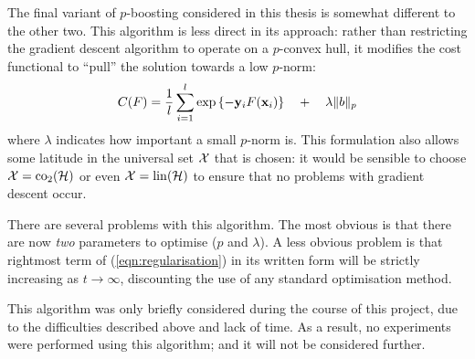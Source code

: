 The final variant of $p$-boosting considered in this thesis is
somewhat different to the other two.  This algorithm is less direct in
its approach: rather than restricting the gradient descent algorithm
to operate on a $p$-convex hull, it modifies the cost functional to
``pull'' the solution towards a low $p$-norm:
%
\begin{equation}
C(F) = \frac{1}{l} \sum_{i=1}^{l} \exp
\left\{ -\mathbf{y}_iF(\mathbf{x}_i) \right\} \quad + \quad \lambda \|b\|_p
\label{eqn:regularisation}
\end{equation}
%
where $\lambda$ indicates how important a small $p$-norm is.  This
formulation also allows some latitude in the universal set $\mathcal{X}$
that is chosen: it would be sensible to choose $\mathcal{X} = \mathrm{co}_2(\mathcal{H})$
or even $\mathcal{X} = \mathrm{lin}(\mathcal{H})$ to ensure that no problems with gradient
descent occur.

There are several problems with this algorithm.  The most obvious is that
there are now \emph{two} parameters to optimise ($p$ and $\lambda$).
A less obvious problem is that rightmost term of
(\ref{eqn:regularisation}) in its written form will be strictly
increasing as $t \rightarrow \infty$, discounting the use of any
standard optimisation method.

This algorithm was only briefly considered during the course of this
project, due to the difficulties described above and lack of time.  As
a result, no experiments were performed using this algorithm; and it
will not be considered further.




